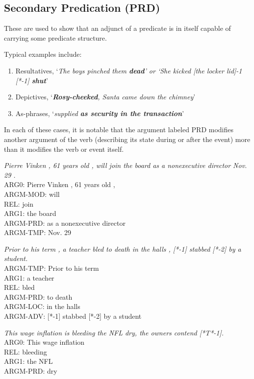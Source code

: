 \documentclass[11pt]{report}
\begin{document}
\subsection{Secondary Predication (PRD)}
\label{ssec: PRD}

These are used to show that an adjunct of a predicate is in itself capable of carrying some predicate structure. 

Typical examples include:
\begin{enumerate}
\item Resultatives, `\textit{The boys pinched them \textbf{dead}' or `She kicked [the locker lid]-1 [*-1] \textbf{shut}}' 
\item Depictives, `\textit{\textbf{Rosy-cheeked}, Santa came down the chimney}' 
\item As-phrases, `\textit{supplied \textbf{as security in the transaction}}' 
\end{enumerate}

In each of these cases, it is notable that the argument labeled PRD modifies another argument of the verb (describing its state during or after the event) more than it modifies the verb or event itself.  

\textit{Pierre Vinken , 61 years old , will join the board as a nonexecutive director Nov. 29 .}\\
ARG0:        Pierre Vinken , 61 years old , \\
ARGM-MOD:        will \\
REL:        join \\
ARG1:        the board\\ 
ARGM-PRD:        as a nonexecutive director\\ 
ARGM-TMP:        Nov. 29 

\textit{Prior to his term , a teacher bled to death in the halls , [*-1] stabbed [*-2] by a student.}\\
ARGM-TMP:        Prior to his term \\
ARG1:        a teacher \\
REL:        bled \\
ARGM-PRD:        to death\\ 
ARGM-LOC:        in the halls\\ 
ARGM-ADV:        [*-1] stabbed [*-2] by a student

\textit{This wage inflation is bleeding the NFL dry, the owners contend [*T*-1]. }\\
ARG0:        This wage inflation \\
REL:        bleeding \\
ARG1:        the NFL \\
ARGM-PRD:        dry 
\end{document}
